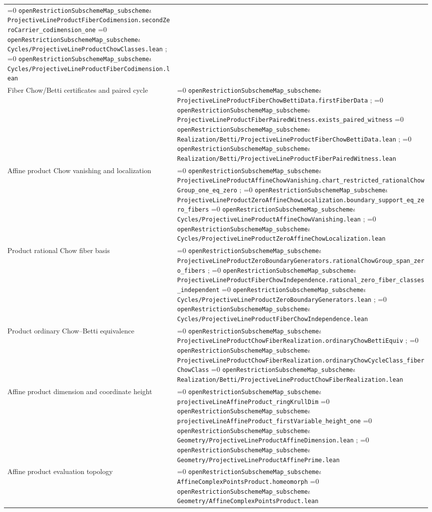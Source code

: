 \documentclass[11pt]{article}
\theoremstyle{definition}
\theoremstyle{remark}
\newcommand{\leanpath}[1]{%
  \ifnum\pdfstrcmp{\detokenize{#1}}%
      {\detokenize{openRestrictionSubschemeMap_subschemeι}}=0
    \texttt{\nolinkurl{openRestrictionSubschemeMap_subscheme}}\ensuremath{\iota}%
  \else
    \texttt{\nolinkurl{#1}}%
  \fi}
\begin{document}
\begin{longtable}{@{}>{\raggedright\arraybackslash}p{}
                >{\raggedright\arraybackslash}p{}@{}}
\leanpath{ProjectiveLineProductFiberCodimension.secondZeroCarrier_codimension_one}\newline
\leanpath{Cycles/ProjectiveLineProductChowClasses.lean};
\leanpath{Cycles/ProjectiveLineProductFiberCodimension.lean}\\
Fiber Chow/Betti certificates and paired cycle &
\leanpath{ProjectiveLineProductFiberChowBettiData.firstFiberData};
\leanpath{ProjectiveLineProductFiberPairedWitness.exists_paired_witness}\newline
\leanpath{Realization/Betti/ProjectiveLineProductFiberChowBettiData.lean};
\leanpath{Realization/Betti/ProjectiveLineProductFiberPairedWitness.lean}\\
Affine product Chow vanishing and localization &
\leanpath{ProjectiveLineProductAffineChowVanishing.chart_restricted_rationalChowGroup_one_eq_zero};
\leanpath{ProjectiveLineProductZeroAffineChowLocalization.boundary_support_eq_zero_fibers}\newline
\leanpath{Cycles/ProjectiveLineProductAffineChowVanishing.lean};
\leanpath{Cycles/ProjectiveLineProductZeroAffineChowLocalization.lean}\\
Product rational Chow fiber basis &
\leanpath{ProjectiveLineProductZeroBoundaryGenerators.rationalChowGroup_span_zero_fibers};
\leanpath{ProjectiveLineProductFiberChowIndependence.rational_zero_fiber_classes_independent}\newline
\leanpath{Cycles/ProjectiveLineProductZeroBoundaryGenerators.lean};
\leanpath{Cycles/ProjectiveLineProductFiberChowIndependence.lean}\\
Product ordinary Chow--Betti equivalence &
\leanpath{ProjectiveLineProductChowFiberRealization.ordinaryChowBettiEquiv};
\leanpath{ProjectiveLineProductChowFiberRealization.ordinaryChowCycleClass_fiberChowClass}\newline
\leanpath{Realization/Betti/ProjectiveLineProductChowFiberRealization.lean}\\
Affine product dimension and coordinate height &
\leanpath{projectiveLineAffineProduct_ringKrullDim}\newline
\leanpath{projectiveLineAffineProduct_firstVariable_height_one}\newline
\leanpath{Geometry/ProjectiveLineProductAffineDimension.lean};
\leanpath{Geometry/ProjectiveLineProductAffinePrime.lean}\\
Affine product evaluation topology &
\leanpath{AffineComplexPointsProduct.homeomorph}\newline
\leanpath{Geometry/AffineComplexPointsProduct.lean}\\

\end{longtable}
\end{document}
